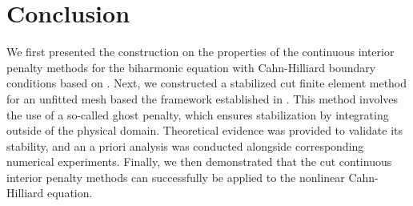 \documentclass[11pt]{article}
\theoremstyle{remark}
\numberwithin{equation}{section}
\begin{document}
\newpage
\section{Conclusion}%
\label{sec:conclusion}

We first presented the construction on the properties of the continuous interior penalty methods for the biharmonic equation with Cahn-Hilliard boundary conditions based on \cite{feng2007fully, brenner2012}.
Next, we constructed a stabilized cut finite element method for an unfitted mesh based the framework established in \cite{gurkan2019stabilized}.
This method involves the use of a so-called ghost penalty, which ensures stabilization by integrating
outside of the physical domain.
Theoretical evidence was provided to validate its stability, and an a priori analysis was conducted alongside corresponding numerical experiments.
Finally, we then demonstrated that the cut continuous interior penalty methods can successfully be applied to the nonlinear Cahn-Hilliard equation.


    \printbibliography

    
\end{document}
